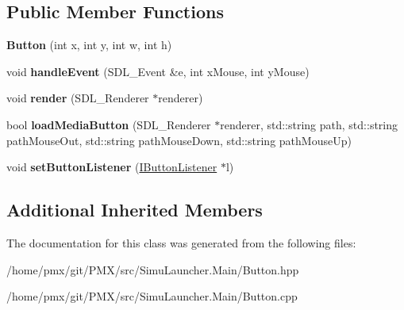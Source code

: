 \subsection*{Public Member Functions}
\begin{DoxyCompactItemize}
\item 
\mbox{\label{classButton_ae0ca5bf2e8abdf49fa9c535822b91940}} 
{\bfseries Button} (int x, int y, int w, int h)
\item 
\mbox{\label{classButton_a2cf2b7c941b3ff63045c9db79709a9ee}} 
void {\bfseries handle\+Event} (S\+D\+L\+\_\+\+Event \&e, int x\+Mouse, int y\+Mouse)
\item 
\mbox{\label{classButton_ada4d479b9bfb12521cccfbb9e865a775}} 
void {\bfseries render} (S\+D\+L\+\_\+\+Renderer $\ast$renderer)
\item 
\mbox{\label{classButton_ac085c2e198d7586246d646865dda4fba}} 
bool {\bfseries load\+Media\+Button} (S\+D\+L\+\_\+\+Renderer $\ast$renderer, std\+::string path, std\+::string path\+Mouse\+Out, std\+::string path\+Mouse\+Down, std\+::string path\+Mouse\+Up)
\item 
\mbox{\label{classButton_abe67df4e7597732214979a5098629a7f}} 
void {\bfseries set\+Button\+Listener} (\hyperlink{classIButtonListener}{I\+Button\+Listener} $\ast$l)
\end{DoxyCompactItemize}
\subsection*{Additional Inherited Members}


The documentation for this class was generated from the following files\+:\begin{DoxyCompactItemize}
\item 
/home/pmx/git/\+P\+M\+X/src/\+Simu\+Launcher.\+Main/Button.\+hpp\item 
/home/pmx/git/\+P\+M\+X/src/\+Simu\+Launcher.\+Main/Button.\+cpp\end{DoxyCompactItemize}
